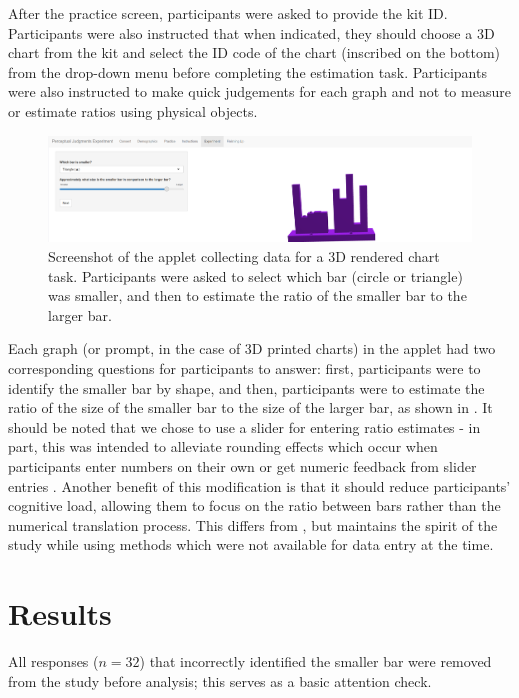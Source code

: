 \documentclass[letterpaper,inpress,dvipsnames]{jdsart}
\begin{document}
After the practice screen, participants were asked to provide the kit ID. Participants were also instructed that when indicated, they should choose a 3D chart from the kit and select the ID code of the chart (inscribed on the bottom) from the drop-down menu before completing the estimation task.
Participants were also instructed to make quick judgements for each graph and not to measure or estimate ratios using physical objects.

\begin{figure}
\includegraphics[width=0.8\linewidth]{_images/05-Experiment-05-filled-in} \caption{Screenshot of the applet collecting data for a 3D rendered chart task. Participants were asked to select which bar (circle or triangle) was smaller, and then to estimate the ratio of the smaller bar to the larger bar.}\label{fig:experiment3dRender}
\end{figure}

Each graph (or prompt, in the case of 3D printed charts) in the applet had two corresponding questions for participants to answer: first, participants were to identify the smaller bar by shape, and then, participants were to estimate the ratio of the size of the smaller bar to the size of the larger bar, as shown in .
It should be noted that we chose to use a slider for entering ratio estimates - in part, this was intended to alleviate rounding effects which occur when participants enter numbers on their own or get numeric feedback from slider entries \citep{ruudUncertaintyCausesRounding2014a, maineriSliderBarsMultiDevice2021}.
Another benefit of this modification is that it should reduce participants' cognitive load, allowing them to focus on the ratio between bars rather than the numerical translation process.
This differs from \citet{clevelandGraphical1984}, but maintains the spirit of the study while using methods which were not available for data entry at the time.

\hypertarget{results}{%
\section{Results}\label{results}}

All responses (\(n = 32\)) that incorrectly identified the smaller bar were removed from the study before analysis; this serves as a basic attention check.
\end{document}
